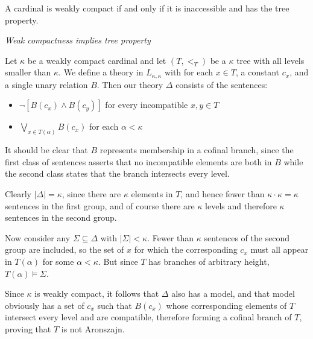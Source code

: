 \documentclass[12pt]{article}
\begin{document}

A cardinal is weakly compact if and only if it is inaccessible and has the tree property.

\emph{Weak compactness implies tree property}

Let $\kappa$ be a weakly compact cardinal and let $(T,<_T)$ be a $\kappa$ tree with all levels smaller than $\kappa$.  We define a theory in $L_{\kappa,\kappa}$ with for each $x\in T$, a constant $c_x$, and a single unary relation $B$.  Then our theory $\Delta$ consists of the sentences:
\begin{itemize}

\item $\neg \left[B(c_x) \wedge B(c_y)\right]$ for every incompatible $x,y\in T$

\item $\bigvee_{x\in T(\alpha)} B(c_x)$ for each $\alpha<\kappa$
\end{itemize}

It should be clear that $B$ represents membership in a cofinal branch, since the first class of sentences asserts that no incompatible elements are both in $B$ while the second class states that the branch intersects every level.

Clearly $|\Delta|=\kappa$, since there are $\kappa$ elements in $T$, and hence fewer than $\kappa\cdot\kappa=\kappa$ sentences in the first group, and of course there are $\kappa$ levels and therefore $\kappa$ sentences in the second group.

Now consider any $\Sigma\subseteq\Delta$ with $|\Sigma|<\kappa$.  Fewer than $\kappa$ sentences of the second group are included, so the set of $x$ for which the corresponding $c_x$ must all appear in $T(\alpha)$ for some $\alpha<\kappa$.  But since $T$ has branches of arbitrary height, $T(\alpha)\models\Sigma$.

Since $\kappa$ is weakly compact, it follows that $\Delta$ also has a model, and that model obviously has a set of $c_x$ such that $B(c_x)$ whose corresponding elements of $T$ intersect every level and are compatible, therefore forming a cofinal branch of $T$, proving that $T$ is not Aronszajn.
\end{document}
